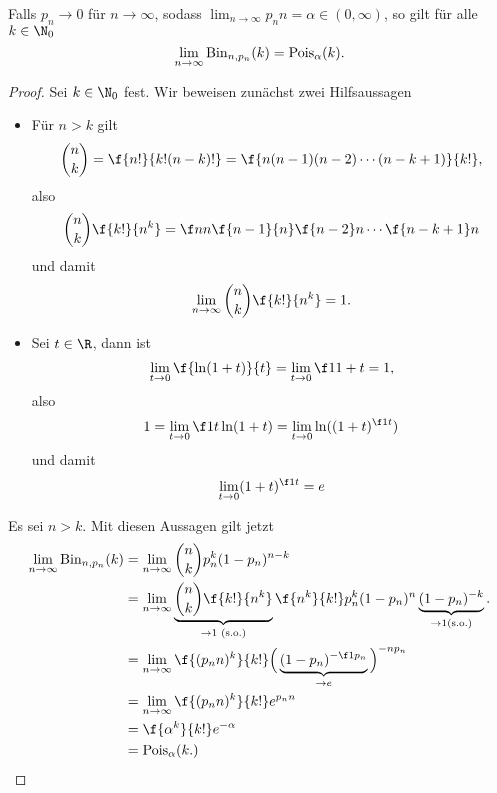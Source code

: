 \begin{st} \label{1.2.7}
	Falls $p_n \to 0$ für $n \to \infty$, sodass $\lim_{n\to\infty} p_n n = \alpha \in (0,\infty)$, so gilt für alle $k \in \N_0$
	\[
		\lim_{n\to \infty} \operatorname{Bin}_{n,p_n}(k)
		= \operatorname{Pois}_\alpha(k).
	\]
	\begin{proof}
		Sei $k \in \N_0$ fest.
		Wir beweisen zunächst zwei Hilfsaussagen
		\begin{itemize}
			\item
				Für $n > k$ gilt
				\[
					\binom{n}{k}
					= \f {n!}{k!(n-k)!}
					= \f {n(n-1)(n-2)\dotsb(n-k+1)}{k!},
				\]
				also
				\[
					\binom{n}{k} \f {k!}{n^k}
					= \f nn \f {n-1}{n} \f{n-2}n \dotsb \f {n-k+1}n
				\]
				und damit
				\[
					\lim_{n\to\infty} \binom{n}{k} \f {k!}{n^k} = 1.
				\]
			\item
				Sei $t \in \R$, dann ist
				\[
					\lim_{t\to 0} \f {\ln(1+t)}{t}
					= \lim_{t\to 0} \f 1{1+t}
					= 1,
				\]
				also
				\[
					1
					= \lim_{t\to 0} \f 1t \ln(1+t)
					= \lim_{t \to 0} \ln((1+t)^{\f 1t})
				\]
				und damit
				\[
					\lim_{t\to 0} (1+t)^{\f 1t}
					= e
				\]
		\end{itemize}
		Es sei \oBdA $n > k$.
		Mit diesen Aussagen gilt jetzt
		\begin{align*}
			\lim_{n\to\infty} \Bin_{n,p_n}(k)
			&= \lim_{n\to\infty} \binom{n}{k}p_n^k (1-p_n)^{n-k} \\
			&= \lim_{n\to\infty} \underbrace{\binom{n}{k} \f {k!}{n^k}}_{\to 1 \text{ (s.o.)}}\f {n^k}{k!} p_n^k (1-p_n)^n  \underbrace{(1-p_n)^{-k}}_{\to 1 \text{(s.o.)}}. \\
			&= \lim_{n\to \infty} \f {(p_n n)^k}{k!}  \Big( \underbrace{(1-p_n)^{-\f 1{p_n}}}_{\to e} \Big)^{-n p_n} \\
			&= \lim_{n\to \infty} \f {(p_n n)^k}{k!} e^{p_n n} \\
			&= \f {\alpha^k}{k!} e^{-\alpha} \\
			&= \Pois_{\alpha}(k.)
		\end{align*}
	\end{proof}
\end{st}

